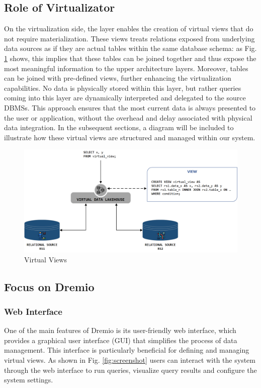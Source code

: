 \subsection{Role of Virtualizator}
On the virtualization side, the layer enables the creation of virtual views that do not require materialization. These views treats relations exposed from underlying data sources as if they are actual tables within the same database schema: as Fig. \ref{fig:virtual} shows, this implies that these tables can be joined together and thus expose the most meaningful information to the upper architecture layers. Moreover, tables can be joined with pre-defined views, further enhancing the virtualization capabilities. No data is physically stored within this layer, but rather queries coming into this layer are dynamically interpreted and delegated to the source \ac{DBMS}s. This approach ensures that the most current data is always presented to the user or application, without the overhead and delay associated with physical data integration. In the subsequent sections, a diagram will be included to illustrate how these virtual views are structured and managed within our system.
\begin{figure}[ht]
    \centering
    \includegraphics[width=15cm]{res/Drawing2.png}
    \caption{Virtual Views}
    \label{fig:virtual}
\end{figure}
\subsection{Focus on Dremio}
\subsubsection{Web Interface}
One of the main features of Dremio is its user-friendly web interface, which provides a graphical user interface (\ac{GUI}) that simplifies the process of data management. This interface is particularly beneficial for defining and managing virtual views. As shown in Fig. \ref{fig:screenshot} users can interact with the system through the web interface to run queries, visualize query results and configure the system settings.
